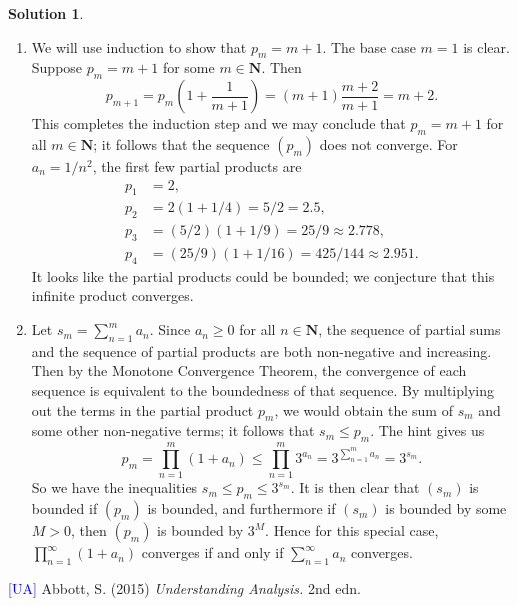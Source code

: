 \documentclass[12pt]{article}
\theoremstyle{definition}
\theoremstyle{exercise}
\theoremstyle{solution}
\newtheorem*{solution}{Solution}
\newcommand{\N}{\mathbf{N}}
\begin{document}
\begin{solution}
    \begin{enumerate}
        \item We will use induction to show that \( p_m = m + 1 \). The base case \( m = 1 \) is clear. Suppose \( p_m = m + 1 \) for some \( m \in \N \). Then
        \[
            p_{m+1} = p_m \left( 1 + \frac{1}{m+1} \right) = (m + 1) \frac{m+2}{m+1} = m + 2.
        \]
        This completes the induction step and we may conclude that \( p_m = m + 1 \) for all \( m \in \N \); it follows that the sequence \( (p_m) \) does not converge. For \( a_n = 1/n^2 \), the first few partial products are
        \begin{align*}
            p_1 &= 2, \\
            p_2 &= 2(1 + 1/4) = 5/2 = 2.5, \\
            p_3 &= (5/2)(1 + 1/9) = 25/9 \approx 2.778, \\
            p_4  &= (25/9)(1 + 1/16) = 425/144 \approx 2.951.
        \end{align*}
        It looks like the partial products could be bounded; we conjecture that this infinite product converges.

        \item Let \( s_m = \sum_{n=1}^m a_n \). Since \( a_n \geq 0 \) for all \( n \in \N \), the sequence of partial sums and the sequence of partial products are both non-negative and increasing. Then by the Monotone Convergence Theorem, the convergence of each sequence is equivalent to the boundedness of that sequence. By multiplying out the terms in the partial product \( p_m \), we would obtain the sum of \( s_m \) and some other non-negative terms; it follows that \( s_m \leq p_m \). The hint gives us
        \[
            p_m = \prod_{n=1}^m (1 + a_n) \leq \prod_{n=1}^m 3^{a_n} = 3^{\sum_{n=1}^m a_n} = 3^{s_m}.
        \]
        So we have the inequalities \( s_m \leq p_m \leq 3^{s_m} \). It is then clear that \( (s_m) \) is bounded if \( (p_m) \) is bounded, and furthermore if \( (s_m) \) is bounded by some \( M > 0 \), then \( (p_m) \) is bounded by \( 3^M \). Hence for this special case, \( \prod_{n=1}^{\infty} (1 + a_n) \) converges if and only if \( \sum_{n=1}^{\infty} a_n \) converges.
    \end{enumerate}
\end{solution}

\noindent \hrulefill

\noindent \hypertarget{ua}{\textcolor{blue}{[UA]} Abbott, S. (2015) \textit{Understanding Analysis.} 2nd edn.}
\end{document}
